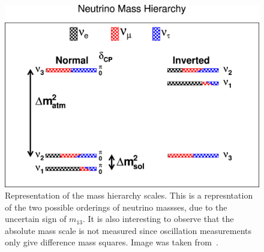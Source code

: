 \begin{figure}[]
\centering
\includegraphics[width=\textwidth]{images/mass_hierarchy.jpg}
\caption{Representation of the mass hierarchy scales. This is a represntation of the two possible orderings of neutrino massses, due to the uncertain sign of $m_{13}$. It is also interesting to observe that the absolute mass scale is not measured since oscillation measurements only give difference mass squares. Image was taken from~\citep{QIAN20151}.}
\label{fig:mass_hierarchy}
\end{figure}

